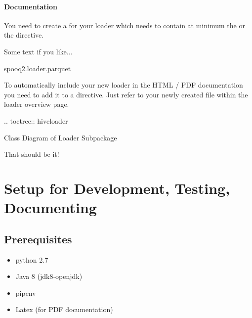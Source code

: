 \documentclass[a4paper,10pt, twoside,english]{sphinxmanual}
\begin{document}
\paragraph{Documentation}
\label{\detokenize{base_classes/loader:documentation}}
You need to create a  for your loader
which needs to contain at minimum the  or the  directive.
\def\sphinxLiteralBlockLabel{\label{\detokenize{base_classes/loader:id4}}}
\begin{sphinxVerbatim}[commandchars=\\\{\}]

Some text if you like...

  spooq2.loader.parquet
\end{sphinxVerbatim}

To automatically include your new loader in the HTML / PDF documentation
you need to add it to a  directive. Just refer to your newly created
 file within the loader overview page.
\def\sphinxLiteralBlockLabel{\label{\detokenize{base_classes/loader:id5}}}
\begin{sphinxVerbatim}[commandchars=\\\{\}]
 .. toctree::
     hive\PYGZus{}loader
 
 Class Diagram of Loader Subpackage
\end{sphinxVerbatim}

That should be it!


\section{Setup for Development, Testing, Documenting}
\label{\detokenize{setup_development_testing:setup-for-development-testing-documenting}}\label{\detokenize{setup_development_testing:dev-setup}}\label{\detokenize{setup_development_testing::doc}}


\subsection{Prerequisites}
\label{\detokenize{setup_development_testing:prerequisites}}\begin{itemize}
\item {} 
python 2.7

\item {} 
Java 8 (jdk8-openjdk)

\item {} 
pipenv

\item {} 
Latex (for PDF documentation)

\end{itemize}
\end{document}

